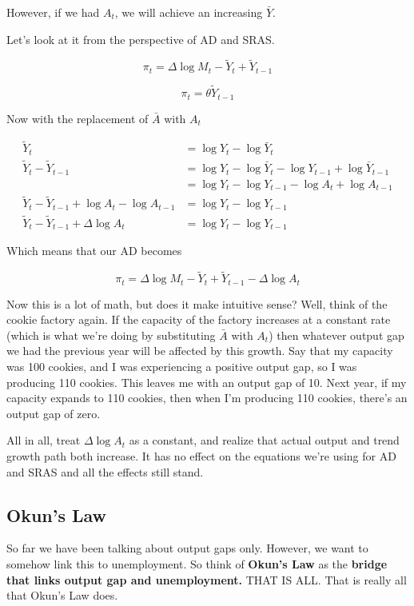 \documentclass[11pt]{scrartcl}
\newcommand{\og}{\ensuremath{\tilde{Y}}}
\begin{document}
However, if we had $A_t$, we will achieve an increasing $\bar{Y}$.

Let's look at it from the perspective of AD and SRAS.

\[ \pi_t = \Delta \log{M_t} - \og_t + \og_{t-1} \]

\[\pi_t = \theta \og_{t-1} \]

Now with the replacement of $\bar{A}$ with $A_t$

\begin{align*}
\og_t &= \log{Y_t} - \log{\bar{Y}_t} \\
\og_t - \og_{t-1} &= \log{Y_t} - \log{\bar{Y}_t} - \log{Y_{t-1}} + \log{\bar{Y}_{t-1}} \\
&= \log{Y_t} - \log{Y_{t-1}} - \log{A_t} + \log{A_{t-1}} \\ 
\og_t - \og_{t-1} + \log{A_t} - \log{A_{t-1}} &= \log{Y_t} - \log{Y_{t-1}} \\ 
\og_t - \og_{t-1} + \Delta \log{A_t} &= \log{Y_t} - \log{Y_{t-1}}
\end{align*}

Which means that our AD becomes

\[ \pi_t  = \Delta \log{M_t} - \og_t + \og_{t-1} - \Delta \log{A_t} \]

Now this is a lot of math, but does it make intuitive sense? Well, think of the cookie factory again. If the capacity of the factory increases at a constant rate (which is what we're doing by substituting $\bar{A}$ with $A_t$) then whatever output gap we had the previous year will be affected by this growth. Say that my capacity was 100 cookies, and I was experiencing a positive output gap, so I was producing 110 cookies. This leaves me with an output gap of 10. Next year, if my capacity expands to 110 cookies, then when I'm producing 110 cookies, there's an output gap of zero.

All in all, treat $\Delta \log{A_t}$ as a constant, and realize that actual output and trend growth path both increase. It has no effect on the equations we're using for AD and SRAS and all the effects still stand.

\subsection{Okun's Law}

So far we have been talking about output gaps only. However, we want to somehow link this to unemployment. So think of \textbf{Okun's Law} as the \textbf{bridge that links output gap and unemployment.} THAT IS ALL. That is really all that Okun's Law does. 
\end{document}
